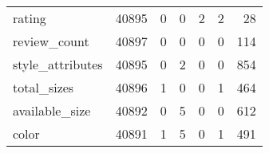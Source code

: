 \begin{tabular}{lrrrrrr}
rating           &                                         40895 &                                         0 &                                             0 &                                         2 &                      2 &               28 \\
review\_count     &                                         40897 &                                         0 &                                             0 &                                         0 &                      0 &              114 \\
style\_attributes &                                         40895 &                                         0 &                                             2 &                                         0 &                      0 &              854 \\
total\_sizes      &                                         40896 &                                         1 &                                             0 &                                         0 &                      1 &              464 \\
available\_size   &                                         40892 &                                         0 &                                             5 &                                         0 &                      0 &              612 \\
color            &                                         40891 &                                         1 &                                             5 &                                         0 &                      1 &              491 \\
\bottomrule
\end{tabular}
